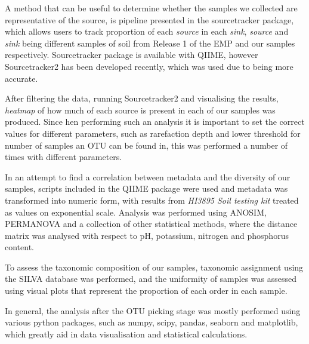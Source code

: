 \documentclass[12pt,twocolumn]{article}
\begin{document}
\par
A method that can be useful to determine whether the samples we collected are representative of the source, is pipeline presented in the sourcetracker package\cite{Knights2011}, which allows users to track proportion of each \textit{source} in each \textit{sink}, \textit{source} and \textit{sink} being different samples of soil from Release 1 of the EMP and our samples respectively. Sourcetracker package is available with QIIME, however Sourcetracker2 has been developed recently, which was used due to being more accurate. 
\par
After filtering the data, running Sourcetracker2 and visualising the results, \textit{heatmap} of how much of each source is present in each of our samples was produced. Since hen performing such an analysis it is important to set the correct values for different parameters, such as rarefaction depth and lower threshold for number of samples an OTU can be found in, this was performed a number of times with different parameters.
\par
In an attempt to find a correlation between metadata and the diversity of our samples, scripts included in the QIIME package were used and metadata was transformed into numeric form, with results from \textit{HI3895 Soil testing kit} treated as values on exponential scale. Analysis was performed using ANOSIM\cite{CLARKE1993}, PERMANOVA\cite{Tang2016} and a collection of other statistical methods, where the distance matrix was analysed with respect to pH, potassium, nitrogen and phosphorus content.
\par
To assess the taxonomic composition of our samples, taxonomic assignment using the SILVA\cite{Quast2012} database was performed, and the uniformity of samples was assessed using visual plots that represent the proportion of each order in each sample. 
\par
In general, the analysis after the OTU picking stage was mostly performed using various python packages, such as numpy, scipy, pandas, seaborn and matplotlib, which greatly aid in data visualisation and statistical calculations.
%
%
\end{document}

